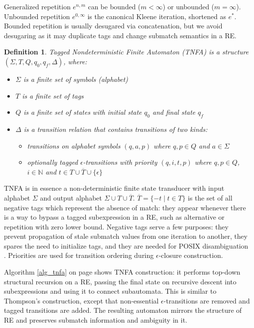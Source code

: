 \documentclass[]{article}
\newtheorem{definition}{Definition}
\newcommand*{\Xbar}[1]{\overline{#1}}
\newcommand{\YN}{\mathbb{N}}
\begin{document}
Generalized repetition $e^{n, m}$ can be bounded ($m < \infty$) or unbounded ($m = \infty$).
Unbounded repetition $e^{0,\infty}$ is the canonical Kleene iteration, shortened as $e^*$.
Bounded repetition is usually desugared via concatenation,
but we avoid desugaring as it may duplicate tags and change submatch semantics in a RE.

\begin{definition} \label{def_tnfa}
Tagged Nondeterministic Finite Automaton (TNFA)
is a structure $(\Sigma, T, Q, q_0, q_f, \Delta)$, where:
\begin{itemize}
    \item[] $\Sigma$ is a finite set of symbols (alphabet)
    \item[] $T$ is a finite set of tags
    \item[] $Q$ is a finite set of states with initial state $q_0$ and final state $q_f$
    \item[] $\Delta$ is a transition relation that contains transitions of two kinds:
    \begin{itemize}
        \item[] transitions on alphabet symbols $(q, a, p)$ where $q, p \in Q$ and $a \in \Sigma$
        \item[] optionally tagged $\epsilon$-transitions with priority $(q, i, t, p)$ where $q, p \in Q$, $i \in \YN$ and $t \in T \cup \Xbar{T} \cup \{\epsilon\}$
    \end{itemize}
\end{itemize}
\end{definition}

TNFA is in essence a non-deterministic finite state transducer with input alphabet $\Sigma$ and output alphabet $\Sigma \cup T \cup \Xbar{T}$.
$\Xbar{T} = \{-t \mid t \in T\}$ is the set of all negative tags which represent the absence of match: they appear whenever there is a way to bypass a tagged subexpression in a RE,
such as alternative or repetition with zero lower bound.
Negative tags serve a few purposes:
they prevent propagation of stale submatch values from one iteration to another,
they spares the need to initialize tags,
and they are needed for POSIX disambiguation \cite{BorTro19}.
Priorities are used for transition ordering during $\epsilon$-closure construction.
\medskip

Algorithm \ref{alg_tnfa} on page \pageref{alg_tnfa} shows TNFA construction:
it performs top-down structural recursion on a RE, passing the final state on recursive descent into subexpressions
and using it to connect subautomata.
This is similar to Thompson's construction, except that non-essential $\epsilon$-transitions are removed and tagged transitions are added.
The resulting automaton mirrors the structure of RE and preserves submatch information and ambiguity in it.
\end{document}
